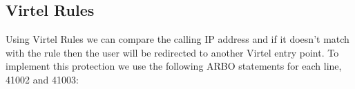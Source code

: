 \documentclass[letterpaper,10pt,english]{sphinxmanual}
\begin{document}
\ignorespaces 

\subsection{Virtel Rules}
\label{\detokenize{connectivity_guide:index-189}}\label{\detokenize{connectivity_guide:id77}}
\sphinxAtStartPar
Using Virtel Rules we can compare the calling IP address and if it doesn’t match with the rule then the user will be re\sphinxhyphen{}directed to another Virtel entry point. To implement this protection we use the following ARBO statements for each line, 41002 and 41003:\sphinxhyphen{}
\end{document}
